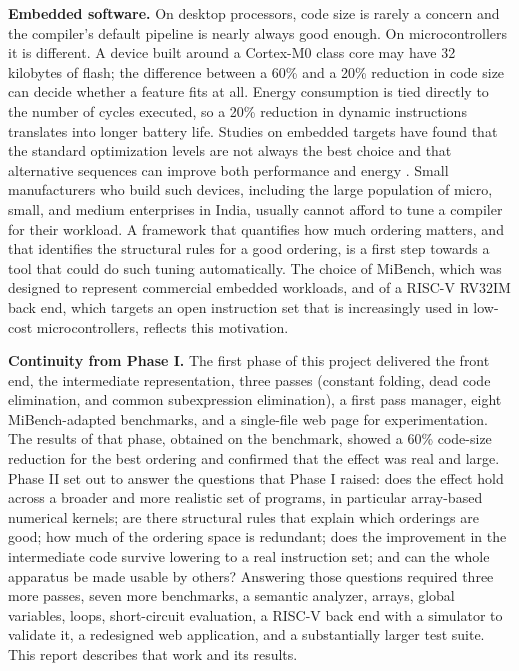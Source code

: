 \textbf{Embedded software.} On desktop processors, code size is rarely a concern and the compiler's default pipeline is nearly always good enough. On microcontrollers it is different. A device built around a Cortex-M0 class core may have 32 kilobytes of flash; the difference between a 60\% and a 20\% reduction in code size can decide whether a feature fits at all. Energy consumption is tied directly to the number of cycles executed, so a 20\% reduction in dynamic instructions translates into longer battery life. Studies on embedded targets have found that the standard optimization levels are not always the best choice and that alternative sequences can improve both performance and energy \cite{georgiou2018}. Small manufacturers who build such devices, including the large population of micro, small, and medium enterprises in India, usually cannot afford to tune a compiler for their workload. A framework that quantifies how much ordering matters, and that identifies the structural rules for a good ordering, is a first step towards a tool that could do such tuning automatically. The choice of MiBench, which was designed to represent commercial embedded workloads, and of a RISC-V RV32IM back end, which targets an open instruction set that is increasingly used in low-cost microcontrollers, reflects this motivation.

\textbf{Continuity from Phase I.} The first phase of this project delivered the front end, the intermediate representation, three passes (constant folding, dead code elimination, and common subexpression elimination), a first pass manager, eight MiBench-adapted benchmarks, and a single-file web page for experimentation. The results of that phase, obtained on the  benchmark, showed a 60\% code-size reduction for the best ordering and confirmed that the effect was real and large. Phase II set out to answer the questions that Phase I raised: does the effect hold across a broader and more realistic set of programs, in particular array-based numerical kernels; are there structural rules that explain which orderings are good; how much of the ordering space is redundant; does the improvement in the intermediate code survive lowering to a real instruction set; and can the whole apparatus be made usable by others? Answering those questions required three more passes, seven more benchmarks, a semantic analyzer, arrays, global variables,  loops, short-circuit evaluation, a RISC-V back end with a simulator to validate it, a redesigned web application, and a substantially larger test suite. This report describes that work and its results.

